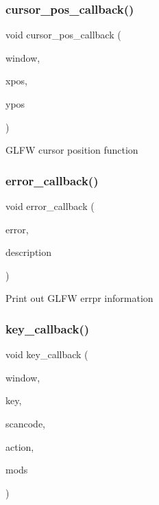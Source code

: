 \subsubsection{\texorpdfstring{cursor\+\_\+pos\+\_\+callback()}{cursor\_pos\_callback()}}
{\footnotesize\ttfamily void cursor\+\_\+pos\+\_\+callback (\begin{DoxyParamCaption}\item[{G\+L\+F\+Wwindow $\ast$}]{window,  }\item[{double}]{xpos,  }\item[{double}]{ypos }\end{DoxyParamCaption})}

G\+L\+FW cursor position function \mbox{\label{Window-Management_8cpp_a4ee391c8bab624943c822faafb2c320e}} 
\subsubsection{\texorpdfstring{error\+\_\+callback()}{error\_callback()}}
{\footnotesize\ttfamily void error\+\_\+callback (\begin{DoxyParamCaption}\item[{int}]{error,  }\item[{const char $\ast$}]{description }\end{DoxyParamCaption})}

Print out G\+L\+FW errpr information \mbox{\label{Window-Management_8cpp_a286930f4e8ede059b83ff6eafa2ff718}} 
\subsubsection{\texorpdfstring{key\+\_\+callback()}{key\_callback()}}
{\footnotesize\ttfamily void key\+\_\+callback (\begin{DoxyParamCaption}\item[{G\+L\+F\+Wwindow $\ast$}]{window,  }\item[{int}]{key,  }\item[{int}]{scancode,  }\item[{int}]{action,  }\item[{int}]{mods }\end{DoxyParamCaption})}

